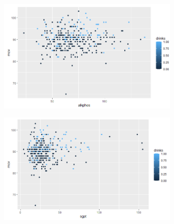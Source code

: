 \begin{figure}[!tbh]
	\centering
	\begin{subfigure}{0.5\textwidth}
	\includegraphics[width=1\linewidth]{figures/tesis_1}
\caption{}
\label{fig:tesis1}
	\end{subfigure}\hfil %
	\begin{subfigure}{0.5\textwidth}
	\includegraphics[width=1\linewidth]{figures/tesis_2}
\caption{}
\label{fig:tesis2}
	\end{subfigure}\hfil %
	
	\medskip
	

\end{figure}
